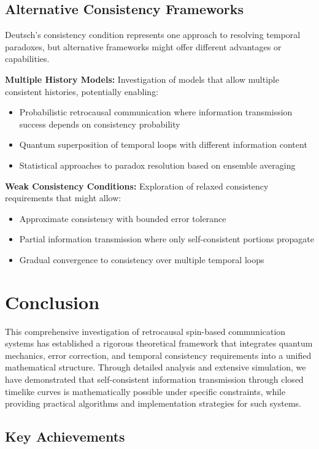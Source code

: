 \documentclass[12pt,a4paper]{article}
\begin{document}
\subsection{Alternative Consistency Frameworks}

Deutsch's consistency condition represents one approach to resolving temporal paradoxes, but alternative frameworks might offer different advantages or capabilities.

\textbf{Multiple History Models:} Investigation of models that allow multiple consistent histories, potentially enabling:
\begin{itemize}
\item Probabilistic retrocausal communication where information transmission success depends on consistency probability
\item Quantum superposition of temporal loops with different information content
\item Statistical approaches to paradox resolution based on ensemble averaging
\end{itemize}

\textbf{Weak Consistency Conditions:} Exploration of relaxed consistency requirements that might allow:
\begin{itemize}
\item Approximate consistency with bounded error tolerance
\item Partial information transmission where only self-consistent portions propagate
\item Gradual convergence to consistency over multiple temporal loops
\end{itemize}

\section{Conclusion}

This comprehensive investigation of retrocausal spin-based communication systems has established a rigorous theoretical framework that integrates quantum mechanics, error correction, and temporal consistency requirements into a unified mathematical structure. Through detailed analysis and extensive simulation, we have demonstrated that self-consistent information transmission through closed timelike curves is mathematically possible under specific constraints, while providing practical algorithms and implementation strategies for such systems.

\subsection{Key Achievements}
\end{document}
